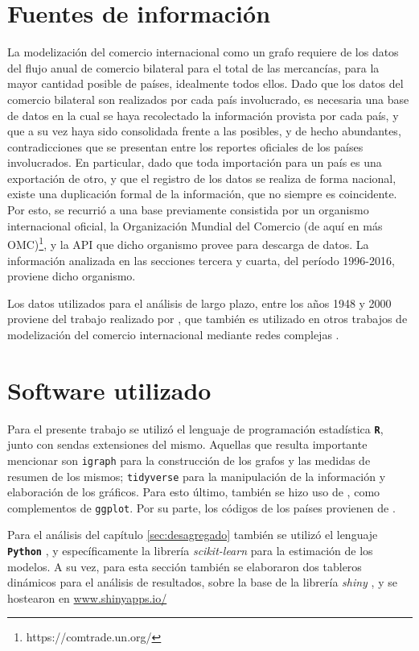 \documentclass[class=article, crop=false]{standalone}
\begin{document}


\section{Fuentes de información}


La modelización del comercio internacional como un grafo requiere de los datos del flujo anual de comercio bilateral para el total de las mercancías, para la mayor cantidad posible de países, idealmente todos ellos. Dado que los datos del comercio bilateral son realizados por cada país involucrado, es necesaria una base de datos en la cual se haya recolectado la información provista por cada país, y que a su vez haya sido consolidada frente a las posibles, y de hecho abundantes, contradicciones que se presentan entre los reportes oficiales de los países involucrados. En particular, dado que toda importación para un país es una exportación de otro, y que el registro de los datos se realiza de forma nacional, existe una duplicación formal de la información, que no siempre es coincidente. Por esto, se recurrió a una base previamente consistida por un organismo internacional oficial, la Organización Mundial del Comercio (de aquí en más OMC)\footnote{https://comtrade.un.org/}, y la API que dicho organismo provee para descarga de datos. La información analizada  en las secciones tercera y cuarta, del período 1996-2016, proviene dicho organismo.   


Los datos utilizados para el análisis de largo plazo, entre los años 1948 y 2000 proviene del trabajo realizado por \cite{Gleditsch2002}, que también es utilizado en otros trabajos de modelización del comercio internacional mediante redes complejas \cite{Fagiolo2010}.


\section{Software utilizado}

Para el presente trabajo se utilizó el lenguaje de programación estadística \texttt{\textbf{R}}\citep{RCoreTeam2017}, junto con sendas extensiones del mismo. Aquellas que resulta importante mencionar son \texttt{igraph}\citep{Csardi2006} para la construcción de los grafos y las medidas de resumen de los mismos; \texttt{tidyverse}\citep{Wickham2017} para la manipulación de la información y elaboración de los gráficos. Para esto último, también se hizo uso de  \citep{Wilke2017,Arnold2017,Neuwirth2014,Slowikowski2017,Vu2011}, como complementos de \texttt{ggplot}. Por su parte, los códigos de los países provienen de \citep{Arel-Bundock2017}.

Para el análisis del capítulo \ref{sec:desagregado} también se utilizó el lenguaje \texttt{\textbf{Python}} \citep{CS-R9526}, y específicamente la librería \textit{scikit-learn} \citep{scikit-learn} para la estimación de los modelos.
A su vez, para esta sección también se elaboraron dos tableros dinámicos para el análisis de resultados, sobre la base de la librería \textit{shiny} \citep{Chang2018}, y se hostearon en \url{www.shinyapps.io/} \citep{Allaire2019}


%
%
%
\end{document}
